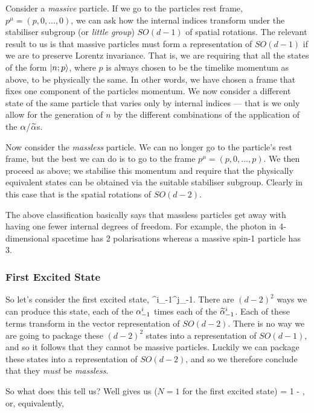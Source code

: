 Consider a \textit{massive} particle. If we go to the particles rest frame, $p^{\mu}=(p,0,...,0)$, we can ask how the internal indices transform under the stabiliser subgroup (or \textit{little group}) $SO(d-1)$ of spatial rotations. The relevant result to us is that massive particles must form a representation of $SO(d-1)$ if we are to preserve Lorentz invariance. That is, we are requiring that all the states of the form $\ket{n;p}$, where $p$ is always chosen to be the timelike momentum as above, to be physically the same. In other words, we have chosen a frame that fixes one component of the particles momentum. We now consider a different state of the same particle that varies only by internal indices --- that is we only allow for the generation of $n$ by the different combinations of the application of the $\alpha$/$\widetilde{\alpha}$s. 

Now consider the \textit{massless} particle. We can no longer go to the particle's rest frame, but the best we can do is to go to the frame $p^{\mu} = (p,0,...,p)$. We then proceed as above; we stabilise this momentum and require that the physically equivalent states can be obtained via the suitable stabiliser subgroup. Clearly in this case that is the spatial rotations of $SO(d-2)$.

The above classification basically says that massless particles get away with having one fewer internal degrees of freedom. For example, the photon in 4-dimensional spacetime has 2 polarisations whereas a massive spin-1 particle has 3. 

\subsubsection*{First Excited State}

So let's consider the first excited state,
\be 
\label{eqn:FirstExcitedState}
    ^i_{-1}\a^j_{-1}.
\ee 
There are $(d-2)^2$ ways we can produce this state, each of the $\alpha^i_{-1}$ times each of the $\widetilde{\alpha}^i_{-1}$. Each of these terms transform in the vector representation of $SO(d-2)$. There is no way we are going to package these $(d-2)^2$ states into a representation of $SO(d-1)$, and so it follows that they cannot be massive particles. Luckily we can package these states into a representation of $SO(d-2)$, and so we therefore conclude that they \textit{must} be \textit{massless}.

So what does this tell us? Well  gives us ($N=1$ for the first excited state)
 = 1 - ,
\ese 
or, equivalently, 

